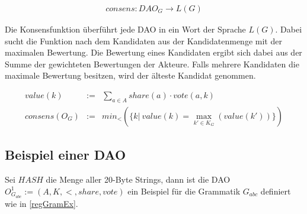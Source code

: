 \documentclass[a4paper,12pt]{report}
\begin{document}
\begin{eqnarray}
  consens: DAO_G \rightarrow L(G)
\end{eqnarray}

Die Konsensfunktion überführt jede DAO in ein Wort der Sprache $L(G)$.
Dabei sucht die Funktion nach dem Kandidaten aus der Kandidatenmenge mit der maximalen Bewertung. Die Bewertung eines Kandidaten ergibt sich dabei aus der Summe der gewichteten Bewertungen der Akteure. Falls mehrere Kandidaten die maximale Bewertung besitzen, wird der älteste Kandidat genommen.

\begin{eqnarray}
value(k) &:=& \sum_{a\in A} share(a) \cdot vote(a,k) \\
consens (O_G) &:=& min_<(\{ k |\ value(k) = \max_{k'\in K_G} (value(k')) \})
\end{eqnarray}




\subsection{Beispiel einer DAO}
\label{daoex}

Sei $HASH$ die Menge aller 20-Byte Strings, dann ist die DAO $O_{G_{abc}}^1 := ( A, K, <, share, vote)$ ein Beispiel für die Grammatik $G_{abc}$ definiert wie in \ref{regGramEx}.
\end{document}
